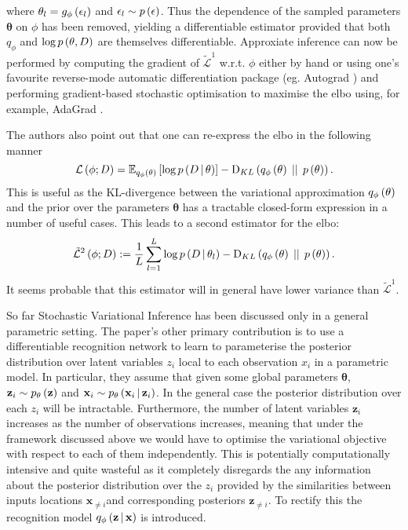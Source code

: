 \documentclass[../report.tex]{subfiles}
\begin{document}
where $\mathbf{\theta}_l = g_\phi \left( \epsilon_l\right)$ and $\epsilon_l \sim p \left( \epsilon\right)$. Thus the dependence of the sampled parameters $\mathbf{\theta}$ on $\phi$ has been removed, yielding a differentiable estimator provided that both $q_\phi$ and $\log p \left( \mathbf{\theta} ,D\right)$ are themselves differentiable. Approxiate inference can now be performed by computing the gradient of $\tilde{\mathcal{L}}^1$ w.r.t. $\phi$ either by hand or using one's favourite reverse-mode automatic differentiation package (eg. Autograd \cite{maclaurinautograd}) and performing gradient-based stochastic optimisation to maximise the elbo using, for example, AdaGrad \cite{duchi2011adaptive}.

The authors also point out that one can re-express the elbo in the following manner
\begin{equation}
  \mathcal{L} \left( \phi; D\right) = \mathbb{E}_{q_\phi \left( \mathbf{\theta}\right)} \left[ \log p \left(D \, \middle\vert \, \mathbf{\theta} \right) \right] - \textrm{D}_{KL} \left( q_\phi \left( \mathbf{\theta}\right) \, \mid \mid \, p \left( \mathbf{\theta}\right)\right).
\end{equation}
This is useful as the KL-divergence between the variational approximation $q_\phi \left( \mathbf{\theta}\right)$ and the prior over the parameters $\mathbf{\theta}$ has a tractable closed-form expression in a number of useful cases. This leads to a second estimator for the elbo:
\begin{equation}
  \tilde{\mathcal{L}}^2 \left( \phi; D\right) := \frac{1}{L} \sum_{l=1}^{L} \log p \left(D \, \middle\vert \, \mathbf{\theta}_l \right) - \textrm{D}_{KL} \left( q_\phi \left( \mathbf{\theta}\right) \, \mid \mid \, p \left( \mathbf{\theta}\right)\right).
\end{equation}
It seems probable that this estimator will in general have lower variance than $\tilde{\mathcal{L}}^1$.

So far Stochastic Variational Inference has been discussed only in a general parametric setting. The paper's other primary contribution is to use a differentiable recognition network to learn to parameterise the posterior distribution over latent variables $z_i$ local to each observation $x_i$ in a parametric model. In particular, they assume that given some global parameters $\mathbf{\theta}$, $\mathbf{z}_i \sim p_\mathbf{\theta} \left( \mathbf{z}\right)$ and $\mathbf{x}_i \sim p_\mathbf{\theta} \left(\mathbf{x}_i \, \middle\vert \, \mathbf{z}_i \right)$. In the general case the posterior distribution over each $z_i$ will be intractable. Furthermore, the number of latent variables $\mathbf{z}_i$ increases as the number of observations increases, meaning that under the framework discussed above we would have to optimise the variational objective with respect to each of them independently. This is potentially computationally intensive and quite wasteful as it completely disregards the any information about the posterior distribution over the $z_i$ provided by the similarities between inputs locations $\mathbf{x}_{\neq i}$and corresponding posteriors $\mathbf{z}_{\neq i}$. To rectify this the recognition model $q_\phi \left(\mathbf{z} \, \middle\vert \, \mathbf{x} \right)$ is introduced.
\end{document}

